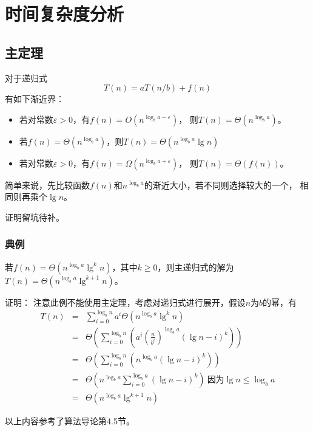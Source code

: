 \section{时间复杂度分析}
\subsection{主定理}
\begin{theorem}
	对于递归式
	\begin{displaymath}
		T(n)=aT(n/b)+f(n)
	\end{displaymath}
	有如下渐近界：
	\begin{itemize}
		\item 若对常数$\varepsilon>0$，有$f(n)=O(n^{\log_b{a-\varepsilon}})$，
		      则$T(n)=\Theta(n^{\log_ba})$。
		\item 若$f(n)=\Theta(n^{\log_ba})$，则$T(n)=\Theta(n^{\log_ba}\lg n)$
		\item 若对常数$\varepsilon>0$，有$f(n)=\Omega(n^{\log_b{a+\varepsilon}})$，
		      则$T(n)=\Theta(f(n))$。
	\end{itemize}
\end{theorem}
简单来说，先比较函数$f(n)$和$n^{\log_ba}$的渐近大小，若不同则选择较大的一个，
相同则再乘个$\lg n$。

证明留坑待补。
\subsubsection{典例}
\begin{theorem}
	若$f(n)=\Theta(n^{\log_ba}\lg^kn)$，其中$k\geq 0$，则主递归式的解为
	$T(n)=\Theta(n^{\log_ba}\lg^{k+1}n)$。
\end{theorem}
证明：
注意此例不能使用主定理，考虑对递归式进行展开，假设$n$为$b$的幂，有
\begin{eqnarray*}
	T(n)&=&\sum_{i=0}^{\log_bn}{a^i\Theta(n^{\log_ba}\lg^kn)}\\
	&=&\Theta\left(\sum_{i=0}^{\log_bn}{\left(a^i\left(\frac{n}{b^i}\right)^
				{\log_b a}(\lg n-i)^k\right)}\right)\\
	&=&\Theta\left(\sum_{i=0}^{\log_bn}{\left(n^{\log_ba}
	(\lg n-i)^k\right)}\right)\\
	&=&\Theta\left(n^{\log_ba}\sum_{i=0}^{\log_ba}{(\lg n-i)^k}\right)
	~\textrm{因为}\lg n\leq \log_ba\\
	&=&\Theta\left(n^{\log_ba}\lg^{k+1}n\right)
\end{eqnarray*}

以上内容参考了算法导论\cite{ITA3}第4.5节。
